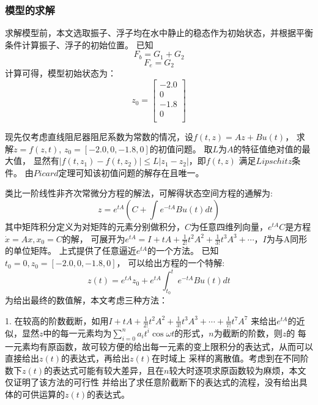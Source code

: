 \documentclass[withoutpreface,bwprint]{cumcmthesis} %
\begin{document}
    \subsubsection{模型的求解}
    求解模型前，本文选取振子、浮子均在水中静止的稳态作为初始状态，并根据平衡条件计算振子、浮子的初始位置。
    已知
    \begin{equation}
        F_b = G_1 + G_2 
        \label{eq:balance_1}
    \end{equation}
    \begin{equation}
        F_e = G_2
        \label{eq:balance_2}
    \end{equation}
    计算可得，模型初始状态为：
    $$
    z_0 = \left [
        \begin{array}{c}
        -2.0 \\
        0 \\
        -1.8 \\            
        0 \\
        \end{array} \right ]
    $$

    现先仅考虑直线阻尼器阻尼系数为常数的情况，设$ f(t, z) = Az + Bu(t) $，
    求解$ \dot{z}= f(z, t) $, $ z_0 = [-2.0, 0, -1.8, 0]$的初值问题。
    取$L$为$A$的特征值绝对值的最大值， 
    显然有$ |f(t, z_1) - f(t, z_2)| \leq L|z_1 - z_2| $，即$ f(t, z) $ 满足$Lipschitz$条件。
    由$ Picard $定理可知该初值问题的解存在且唯一。

    类比一阶线性非齐次常微分方程的解法，可解得状态空间方程的通解为:$$z = e^{tA}(C + \int e^{-tA}Bu(t)dt) $$
    其中矩阵积分定义为对矩阵的元素分别做积分，$ C $为任意四维列向量，$ e^{tA}C $是方程$ \dot{x} = Ax, x_0 = C$的解，
    可展开为$ e^{tA} = I + tA + \frac{1}{2!}t^2A^2 + \frac{1}{3!}t^3A^3 + \cdots $，$ I $为与A同形的单位矩阵。
    上式提供了任意逼近$ e^{tA} $的一个方法。
    已知$ t_0 = 0, z_0 = [-2.0, 0, -1.8, 0]$， 可以给出方程的一个特解:$$ z(t) = e^{tA}z_0 + e^{tA}\int_{t_0}^t e^{-tA}Bu(t)dt $$
    为给出最终的数值解，本文考虑三种方法：

    1. 在较高的阶数截断，如用$ I + tA + \frac{1}{2!}t^2A^2 + \frac{1}{3!}t^3A^3 + \cdots + \frac{1}{7!}t^7A^7 $
    来给出$ e^{tA} $的近似，显然$ z $中的每一元素均为$ \sum\limits_{i=0}^{n}a_it^i\cos\omega t $的形式，$ n $为截断的阶数，则$ z $的
    每一元素均有原函数，故可较方便的给出每一元素的变上限积分的表达式，从而可以直接给出$ z(t) $的表达式，再给出$ z(t) $在时域上
    采样的离散值。考虑到在不同阶数下$ z(t) $的表达式可能有较大差异，且在$ n $较大时逐项求原函数较为麻烦，本文仅证明了该方法的可行性
    并给出了求任意阶截断下的表达式的流程，没有给出具体的可供运算的$ z(t) $的表达式。
\end{document}
